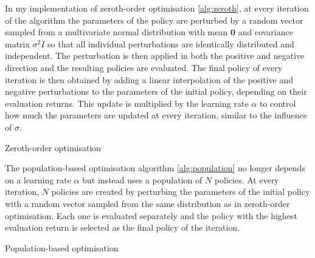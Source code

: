 \documentclass[10pt]{article}
\begin{document}
In my implementation of zeroth-order optimisation \ref{alg:zeroth}, at every iteration of the algorithm the parameters of the policy
are perturbed by a random vector sampled from a multivariate normal distribution with mean $\mathbf{0}$ and covariance matrix $\sigma^2 I$
so that all individual perturbations are identically distributed and independent.
The perturbation is then applied in both the positive and negative direction and the resulting policies are evaluated.
The final policy of every iteration is then obtained by adding a linear interpolation
of the positive and negative perturbations to the parameters of the initial policy, depending on their evaluation returns.
This update is multiplied by the learning rate $\alpha$ to control how much the parameters are updated at every iteration,
similar to the influence of $\sigma$.

\begin{algorithm}[h]

    \caption{Zeroth-order optimisation}
    \label{alg:zeroth}
\end{algorithm}

The population-based optimisation algorithm \ref{alg:population} no longer depends on a learning rate $\alpha$ but instead uses
a population of $N$ policies. At every iteration, $N$ policies are created by perturbing the parameters of the initial policy
with a random vector sampled from the same distribution as in zeroth-order optimisation.
Each one is evaluated separately and the policy with the highest evaluation return is selected as the final policy of the iteration.

\begin{algorithm}[h]
    \caption{Population-based optimisation}
    \label{alg:population}
\end{algorithm}
\end{document}
